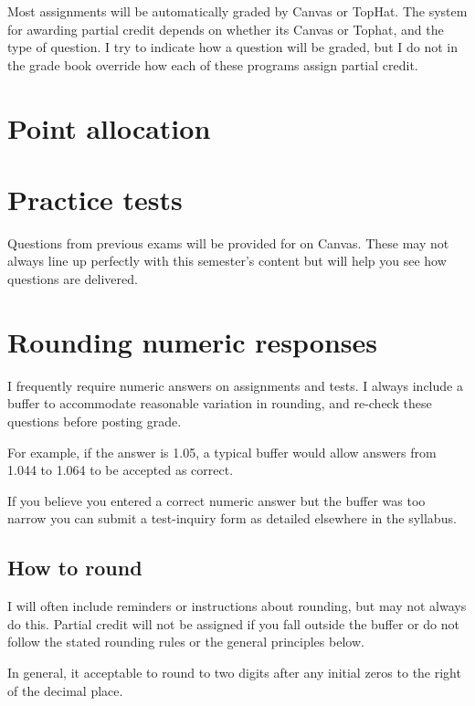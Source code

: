 \documentclass[
]{book}
\begin{document}
Most assignments will be automatically graded by Canvas or TopHat. The system for awarding partial credit depends on whether its Canvas or Tophat, and the type of question. I try to indicate how a question will be graded, but I do not in the grade book override how each of these programs assign partial credit.

\hypertarget{points}{%
\chapter{Point allocation}\label{points}}

\hypertarget{practice-tests}{%
\chapter{Practice tests}\label{practice-tests}}

Questions from previous exams will be provided for on Canvas. These may not always line up perfectly with this semester's content but will help you see how questions are delivered.

\hypertarget{rounding-numeric-responses}{%
\chapter{Rounding numeric responses}\label{rounding-numeric-responses}}

I frequently require numeric answers on assignments and tests. I always include a buffer to accommodate reasonable variation in rounding, and re-check these questions before posting grade.

For example, if the answer is 1.05, a typical buffer would allow answers from 1.044 to 1.064 to be accepted as correct.

If you believe you entered a correct numeric answer but the buffer was too narrow you can submit a test-inquiry form as detailed elsewhere in the syllabus.

\hypertarget{how-to-round}{%
\section{How to round}\label{how-to-round}}

I will often include reminders or instructions about rounding, but may not always do this. Partial credit will not be assigned if you fall outside the buffer or do not follow the stated rounding rules or the general principles below.

In general, it acceptable to round to two digits after any initial zeros to the right of the decimal place.
\end{document}
